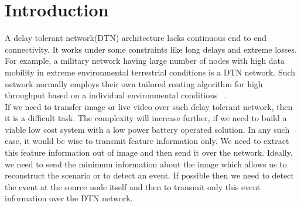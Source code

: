 
\chapter{Introduction} %
\label{Chapter1}

\indent A delay tolerant network(DTN) architecture lacks continuous end
to end connectivity. It works under some constraints like long delays
and extreme losses. For example, a military network having large number
of nodes with high data mobility in extreme environmental terrestrial
conditions is a DTN network. Such network normally employs their own
tailored routing algorithm for high throughput based on a individual
environmental conditions ~\cite[]{1}.\\

\indent If we need to transfer image or live video over such delay
tolerant network, then it is a difficult task. The complexity will
increase further, if we need to build a viable low cost system with a
low power battery operated solution.  In any such case, it would be wise
to transmit feature information only. We need to extract this feature
information out of image and then send it over the network.  Ideally, we
need to send the minimum information about the image which allows us to
reconstruct the scenario or to detect an event. If possible then we need
to detect the event at the source node itself and then to transmit only
this event information over the DTN network.\\

